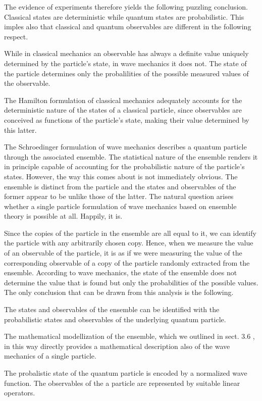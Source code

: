 \documentclass{article}
\begin{document}
The evidence of experiments therefore yields the following puzzling conclusion.
Classical states are deterministic while quantum states are probabilistic.
This imples also that classical and quantum observables are different in the following respect.

While in classical mechanics an observable has always a definite value uniquely determined by the particle's state, in wave mechanics it does not. The state of the particle determines only the probalilities of the possible measured values of the observable.

The Hamilton formulation of classical mechanics adequately accounts for the deterministic nature of the states of a classical particle, since observables are conceived as functions of the particle's state, making their value determined by this latter.

The Schroedinger formulation of wave mechanics describes a quantum particle through the associated ensemble. The statistical nature of the ensemble renders it in principle capable of accounting for the probabilistic nature of the particle's states. However, the way this comes about is not immediately obvious. The ensemble is distinct from the particle and the states and observables of the former appear to be unlike those of the latter. The natural question arises whether a single particle formulation of wave mechanics based on ensemble theory is possible at all. Happily, it is.

Since the copies of the particle in the ensemble are all equal to it, we can identify the particle with any arbitrarily chosen copy. Hence, when we measure the value of an observable of the particle, it is as if we were measuring the value of the corresponding observable of a copy of the particle randomly extracted from the ensemble. According to wave mechanics, the state of the ensemble does not determine the value that is found but only the probabilities of the possible values. The only conclusion that can be drawn from this analysis is the following.

The states and observables of the ensemble can be identified with the probabilistic states and observables of the underlying quantum particle.

The mathematical modellization of the ensemble, which we outlined in sect. 3.6 , in this way directly provides a mathematical description also of the wave mechanics of a single particle.

The probalistic state of the quantum particle is encoded by a normalized wave function. The observables of the a particle are represented by suitable linear operators.
\end{document}
